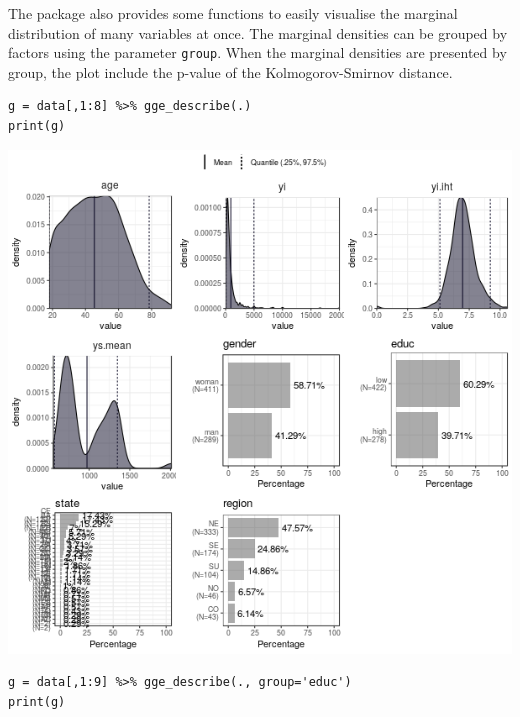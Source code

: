 \documentclass[a4paper]{article}
\begin{document}
The package also provides some functions to easily visualise the marginal distribution of many variables at once. The marginal densities can be grouped by factors using the parameter \texttt{group}. When the marginal densities are presented by group, the plot include the p-value of the Kolmogorov-Smirnov distance.

\lstset{numbers=left,language=r,label= ,caption= ,captionpos=b}
\begin{lstlisting}
g = data[,1:8] %>% gge_describe(.)
print(g)
\end{lstlisting}

\begin{center}
\includegraphics[width=.9\linewidth]{gge_describe.png}
\end{center}



\lstset{numbers=left,language=r,label= ,caption= ,captionpos=b}
\begin{lstlisting}
g = data[,1:9] %>% gge_describe(., group='educ')
print(g)
\end{lstlisting}
\end{document}

